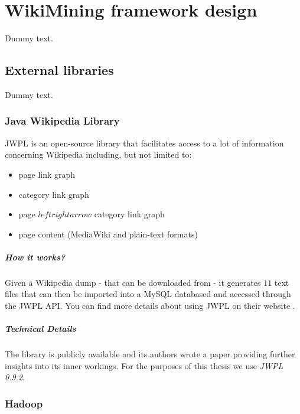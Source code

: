 \chapter{WikiMining framework design}

Dummy text.

\section{External libraries}

Dummy text.

\subsection{Java Wikipedia Library}

\ac{JWPL} is an open-source library that facilitates access to a lot of
information concerning Wikipedia including, but not limited to:
\begin{itemize}
  \item page link graph
  \item category link graph
  \item page \(leftrightarrow\) category link graph
  \item page content (MediaWiki and plain-text formats)
\end{itemize}

\paragraph{How it works?} Given a Wikipedia dump - that can be downloaded from
 - it generates \(11\) text files that can
then be imported into a MySQL databased and accessed through the \ac{JWPL}
\ac{API}. You can find more details about using \ac{JWPL} on their website
.

\paragraph{Technical Details} The library is publicly available
 and its authors wrote a paper
\cite{zesch2008jwpl} providing further insights into its inner workings. For the
purposes of this thesis we use \emph{\ac{JWPL} 0.9.2}.

\subsection{Hadoop}

